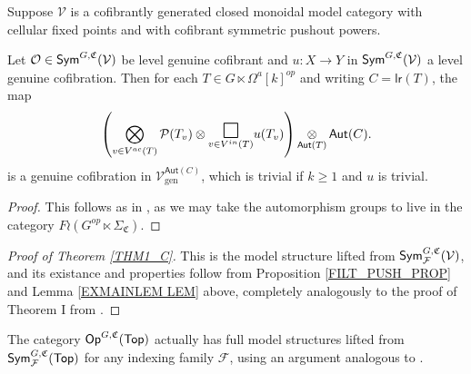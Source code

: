 \documentclass[a4paper,10pt
,draft
]{article}%
\renewcommand{\F}{\mathcal F}
\renewcommand{\1}{\eta}%
\begin{document}
\begin{lemma} %
      \label{EXMAINLEM LEM}
      Suppose $\mathcal{V}$ is a cofibrantly generated closed monoidal model category
      with cellular fixed points and
      with cofibrant symmetric pushout powers.
      
      Let $\mathcal{O} \in \mathsf{Sym}^{G,\mathfrak C}(\mathcal{V})$
      be level genuine cofibrant
      and  
      $u: X \to Y$ in $\mathsf{Sym}^{G, \mathfrak C}(\mathcal V)$ a level genuine cofibration. 
      Then for each $T \in G \ltimes \Omega^a[k]^{op}$ and writing
      $C = \mathsf{lr}(T)$, the map	
      \begin{equation}\label{EXMAINLEM EQ}
            \left(
                  \bigotimes\limits_{v \in V^{ac}(T)}\P(T_v) \otimes
                  \underset{v \in V^{in}(T)}
                  {\mathlarger{\mathlarger{\mathlarger{\square}}}}
                  u(T_v)
            \right) 
            \mathop{\otimes}\limits_{\mathsf{Aut}(T)} \mathsf{Aut}(C).
      \end{equation}
      is a genuine cofibration in 
      $\mathcal{V}^{\mathsf{Aut}(C)}_{\text{gen}}$,
      which is trivial if $k \geq 1$ and $u$ is trivial.	
\end{lemma}
\begin{proof}
      This follows as in \cite{BP_geo}, as we may take the automorphism groups to live in the category $F \wr (G^{op} \ltimes \Sigma_{\mathfrak C}).$ 
\end{proof}




\begin{proof}[Proof of Theorem \ref{THM1_C}]
      This is the model structure lifted from $\Sym^{G, \mathfrak C}_\F(\V)$,
      and its existance and properties follow from
      Proposition \ref{FILT_PUSH_PROP} and Lemma \ref{EXMAINLEM LEM} above,
      completely analogously to the proof of Theorem I from \cite{BP_geo}.
\end{proof}

\begin{remark}
      \label{TOP_FULL_REM}
      The category $\mathsf{Op}^{G,\mathfrak C}(\mathsf{Top})$ actually has full model structures lifted from $\Sym^{G, \mathfrak C}_\F(\Top)$
      for any indexing family $\F$,
      using an argument analogous to \cite[Thm. 3.1]{GW}.
\end{remark}
\end{document}

